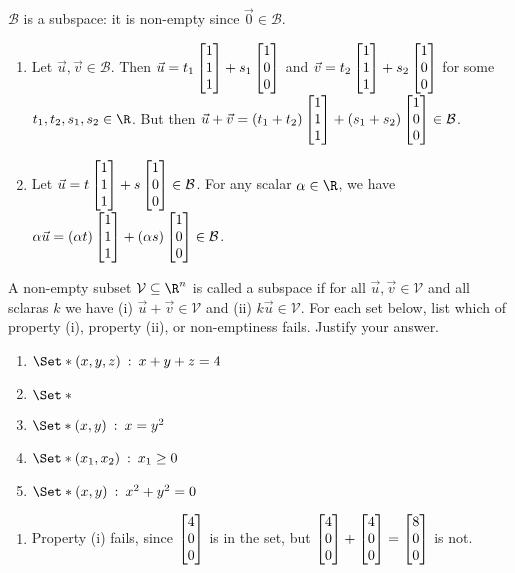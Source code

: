 \begin{exercises}
\begin{problist}
\begin{solution}
\begin{enumerate}
					$\mathcal B$ is a subspace: it is non-empty since $\vec 0\in\mathcal B$. 
				\begin{enumerate}
					\item Let $\vec u,\vec v\in \mathcal B$. Then $\vec u=t_1\mat{1\\1\\1}+s_1\mat{1\\0\\0}$ 
						and $\vec v=t_2\mat{1\\1\\1}+s_2\mat{1\\0\\0}$ for some $t_1,t_2,s_1,s_2\in\R$. 
						But then $\vec u+\vec v=(t_1+t_2)\mat{1\\1\\1}+(s_1+s_2)\mat{1\\0\\0}\in \mathcal B$.
					\item Let $\vec u=t\mat{1\\1\\1}+s\mat{1\\0\\0}\in\mathcal B$. For any scalar $\alpha\in\R$, 
						we have $\alpha\vec u=(\alpha t)\mat{1\\1\\1}+(\alpha s)\mat{1\\0\\0}\in\mathcal B$.
				\end{enumerate}
			\end{enumerate}
		\end{solution}
		
		\prob
		A non-empty subset $\mathcal V \subseteq \R^n$ is called a subspace if
		for all $\vec u, \vec v \in \mathcal V$ and all sclaras $k$ we have
			(i) $\vec u + \vec v \in \mathcal V$ and
			(ii) $k\vec u \in \mathcal V$.
			For each set below, list which of property (i), property (ii), or non-emptiness fails.
			Justify your answer.
		\begin{enumerate}
			\item $\Set*{(x,y,z)\given x+y+z=4}$
			\item $\Set*{}$
			\item $\Set*{(x,y)\given x=y^2}$
			\item $\Set*{(x_1,x_2)\given x_1 \geq 0}$
			\item $\Set*{(x,y)\given x^2+y^2=0}$
		\end{enumerate}
		\begin{solution}
			\begin{enumerate}
				\item Property (i) fails, since $\mat{4\\0\\0}$ is in the set, but $\mat{4\\0\\0}+\mat{4\\0\\0}=\mat{8\\0\\0}$ is not.


\end{enumerate}
\end{solution}
\end{problist}
\end{exercises}
